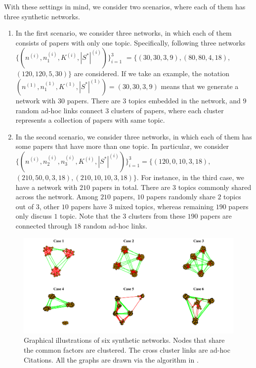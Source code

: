\documentclass[AMS,STIX1COL]{WileyNJD-v2}
\begin{document}
{With these settings in mind, we consider two scenarios, where each of them has three synthetic networks.

\begin{enumerate}
    \item In the first scenario, we consider three networks, in which each of them consists of papers with only one topic.
        Specifically, following three networks
        $\{(n^{(i)},n_{1}^{(i)},K^{(i)},|S^*|^{(i)})\}_{i=1}^{3}$ $=\{(30,30,3,9), (80,80,4,18),$ $(120,120,5,30)\}$ are considered.
        If we take an example, the notation  $(n^{(1)},n_{1}^{(1)},K^{(1)},|S^*|^{(1)})=(30,30,3,9)$ means that we generate a network with $30$ papers. There are $3$ topics embedded in the network, and $9$ random ad-hoc links connect $3$ clusters of papers, where each cluster represents a collection of papers with same topic.

    \item In the second scenario, we consider three networks, in which each of them has some papers that have more than one topic.
        In particular, we consider $\{(n^{(i)},n_{2}^{(i)},n_{3}^{(i)},K^{(i)},|S^{*}|^{(i)})\}_{i=1}^{3}=
        \{(120,0,10,3,18),$ $(210,50,0,3,18),(210,10,10,3,18)\}$.
        For instance, in the third case, we have a network with $210$ papers in total. There are $3$ topics commonly shared across the network.
        Among $210$ papers, $10$ papers randomly share $2$ topics out of $3$, other $10$ papers have $3$ mixed topics, whereas remaining $190$ papers only discuss $1$ topic.
        Note that the $3$ clusters from these $190$ papers are connected through $18$ random ad-hoc links.
\end{enumerate}
\begin{figure}[htbp]
\includegraphics[width=1\textwidth]{Fig1.pdf}
\caption{Graphical illustrations of six synthetic networks.
Nodes that share the common factors are clustered. The cross cluster links are ad-hoc Citations.
All the graphs are drawn via the algorithm in \cite{fruchterman1991graph}.}
\label{fig:figure1}
\end{figure}

}
\end{document}
